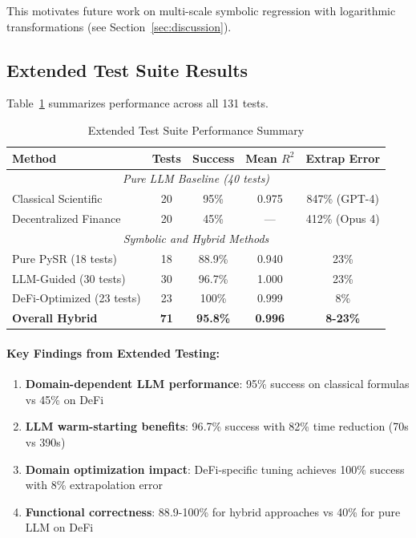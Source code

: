 \documentclass[twoside,11pt]{article}
\begin{document}
This motivates future work on multi-scale symbolic regression with logarithmic transformations (see Section~\ref{sec:discussion})\citep{la2021contemporary}.

\subsection{Extended Test Suite Results}

Table~\ref{tab:extended_results} summarizes performance across all 131 tests.

\begin{table}[htbp]
\centering
\caption{Extended Test Suite Performance Summary}
\label{tab:extended_results}
\begin{tabular}{@{}lcccc@{}}
\toprule
\textbf{Method} & \textbf{Tests} & \textbf{Success} & \textbf{Mean $R^2$} & \textbf{Extrap Error} \\
\midrule
\multicolumn{5}{c}{\textit{Pure LLM Baseline (40 tests)}} \\\citep{kambhampati2024llms}
\midrule
Classical Scientific & 20 & 95\% & 0\citep{virtanen2020scipy}\citep{bubeck2023sparks}\citep{romera2023mathematical}.975 & 847\% (GPT-4) \\
Decentralized Finance & 20 & 45\% & --- & 412\% (Opus 4) \\
\midrule
\multicolumn{5}{c}{\textit{Symbolic and Hybrid Methods}} \\
\midrule
Pure PySR (18 tests) & 18 & 88.9\% & 0.940 & 23\% \\
LLM-Guided (30 tests) & 30 & 96.7\% & 1\citep{kambhampati2024llms}.000 & 23\% \\
DeFi-Optimized (23 tests) & 23 & 100\% & 0.999 & 8\% \\
\midrule
\textbf{Overall Hybrid} & \textbf{71} & \textbf{95.8\%} & \textbf{0.996} & \textbf{8-23\%} \\
\bottomrule
\end{tabular}
\end{table}

\paragraph{Key Findings from Extended Testing:}
\begin{enumerate}
\item \textbf{Domain-dependent LLM performance}: 95\% success on classical formulas vs 45\% on DeFi\citep{kambhampati2024llms}
\item \textbf{LLM warm-starting benefits}: 96\citep{kambhampati2024llms}.7\% success with 82\% time reduction (70s vs 390s)
\item \textbf{Domain optimization impact}: DeFi-specific tuning achieves 100\% success with 8\% extrapolation error
\item \textbf{Functional correctness}: 88\citep{kambhampati2024llms}.9-100\% for hybrid approaches vs 40\% for pure LLM on DeFi
\end{enumerate}
\end{document}
